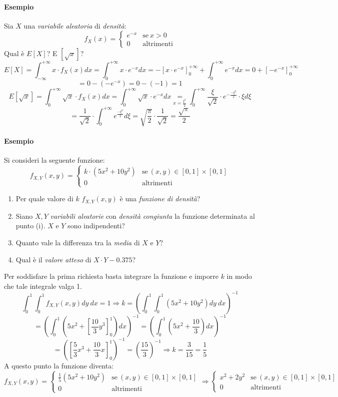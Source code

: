 \documentclass[12pt, a4paper]{report}
\theoremstyle{definition}
\newcommand\underrel[2]{\mathrel{\mathop{#2}\limits_{#1}}}%
\begin{document}
\paragraph*{Esempio}
Sia $X$ una \emph{variabile aleatoria} di \emph{densità}:
\[f_X(x)=\begin{cases}
	{e^{-x}} & \text{se}\ {x>0}\\
	{0} & \text{altrimenti}
\end{cases}\]
Qual è $E[X]$? E $[\sqrt{x}]$?
\[E[X]=\int_{-\infty}^{+\infty}x\cdot f_X(x)dx=\int_{0}^{+\infty}x\cdot e^{-x}dx=-[x\cdot e^{-x}]
_{0}^{+\infty}+\int_{0}^{+\infty}e^{-x}dx=0+[-e^{-x}]_0^{+\infty}\]
\[=0-(-e^{-x})=0-(-1)=1\]
\[E[\sqrt{x}]=\int_0^{+\infty}\sqrt{x}\cdot f_X(x)dx=\int_0^{+\infty}\sqrt{x}\cdot e^{-x}dx
\underrel{x=\frac{\xi^2}{2}}{=}\int_{0}^{+\infty}\frac{\xi}{\sqrt{2}}\cdot e^{-\frac
{-\xi^2}{2}}\cdot \xi d\xi\]
\[=\frac{1}{\sqrt{2}}\cdot \int_0^{+\infty}e^{\frac{-\xi^2}{2}}d\xi=\sqrt{\frac{\pi}
{2}}\cdot \frac{1}{\sqrt{2}}=\frac{\sqrt{\pi}}{2}\]

\paragraph*{Esempio}
Si consideri la seguente funzione:
\[f_{X,Y}(x,y)=\begin{cases}
	{k\cdot (5x^2+10y^2)} & \text{se}\ {(x,y)\in[0,1]\times[0,1]}\\
	{0} & \text{altrimenti}
\end{cases}\]
\begin{enumerate}[label=(\roman*)]
	\item Per quale valore di $k$ $f_{X,Y}(x,y)$ è una \emph{funzione di densità}?
	\item Siano $X, Y$ \emph{variabili aleatorie} con \emph{densità congiunta}
	la funzione determinata al punto (i). $X$ e $Y$ sono indipendenti?
	\item Quanto vale la differenza tra la \emph{media} di $X$ e $Y$?
	\item Qual è il \emph{valore atteso} di $X\cdot Y-0.375$?
\end{enumerate}
Per soddisfare la prima richiesta basta integrare la funzione e imporre $k$ in
modo che tale integrale valga 1.
\[\int_0^1\int_0^1f_{X,Y}(x,y)dy\ dx=1\Rightarrow k=\left(\int_0^1\int_0^1
(5x^2+10y^2)dy\ dx\right)^{-1}\]
\[=\left(\int_0^1\left(5x^2+\left[\frac{10}{3}y^3\right]_0^1\right)dx\right)^{-1}
=\left(\int_0^1\left(5x^2+\frac{10}{3}\right)dx\right)^{-1}\]
\[=\left(\left[\frac{5}{3}x^3+\frac{10}{3}x
\right]_0^1\right)^{-1}=\left(\frac{15}{3}\right)^{-1}\Rightarrow k=\frac{3}{15}
=\frac{1}{5}\]
A questo punto la funzione diventa:
\[f_{X,Y}(x,y)=\begin{cases}
	{\frac{1}{5}(5x^2+10y^2)} & \text{se}\ (x,y)\in[0,1]\times[0,1]\\
	{0} & \text{altrimenti}
\end{cases}\Rightarrow\begin{cases}
	{x^2+2y^2} & \text{se}\ (x,y)\in[0,1]\times[0,1]\\
	{0} & \text{altrimenti}
\end{cases}\]
\end{document}
